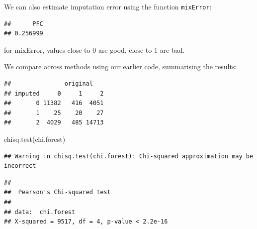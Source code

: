 \documentclass[
]{book}
\newenvironment{Shaded}{\begin{snugshade}}{\end{snugshade}}
\newcommand{\AttributeTok}[1]{\textcolor[rgb]{0.77,0.63,0.00}{#1}}
\newcommand{\FloatTok}[1]{\textcolor[rgb]{0.00,0.00,0.81}{#1}}
\newcommand{\FunctionTok}[1]{\textcolor[rgb]{0.00,0.00,0.00}{#1}}
\newcommand{\NormalTok}[1]{#1}
\newcommand{\OtherTok}[1]{\textcolor[rgb]{0.56,0.35,0.01}{#1}}
\newcommand{\SpecialCharTok}[1]{\textcolor[rgb]{0.00,0.00,0.00}{#1}}
\newcommand{\StringTok}[1]{\textcolor[rgb]{0.31,0.60,0.02}{#1}}
\begin{document}
We can also estimate imputation error using the function \texttt{mixError}:

\begin{Shaded}
\end{Shaded}

\begin{verbatim}
##      PFC 
## 0.256999
\end{verbatim}

for mixError, values close to 0 are good, close to 1 are bad.

We compare across methods using our earlier code, summarising the results:

\begin{Shaded}
\end{Shaded}

\begin{verbatim}
##               original
## imputed     0     1     2
##       0 11382   416  4051
##       1    25    20    27
##       2  4029   485 14713
\end{verbatim}

\begin{Shaded}
\begin{Highlighting}[]
\FunctionTok{chisq.test}\NormalTok{(chi.forest) }
\end{Highlighting}
\end{Shaded}

\begin{verbatim}
## Warning in chisq.test(chi.forest): Chi-squared approximation may be incorrect
\end{verbatim}

\begin{verbatim}
## 
##  Pearson's Chi-squared test
## 
## data:  chi.forest
## X-squared = 9517, df = 4, p-value < 2.2e-16
\end{verbatim}
\end{document}
